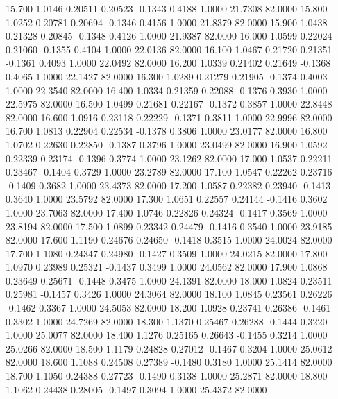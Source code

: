   15.700   1.0146   0.20511   0.20523  -0.1343   0.4188   1.0000  21.7308  82.0000
  15.800   1.0252   0.20781   0.20694  -0.1346   0.4156   1.0000  21.8379  82.0000
  15.900   1.0438   0.21328   0.20845  -0.1348   0.4126   1.0000  21.9387  82.0000
  16.000   1.0599   0.22024   0.21060  -0.1355   0.4104   1.0000  22.0136  82.0000
  16.100   1.0467   0.21720   0.21351  -0.1361   0.4093   1.0000  22.0492  82.0000
  16.200   1.0339   0.21402   0.21649  -0.1368   0.4065   1.0000  22.1427  82.0000
  16.300   1.0289   0.21279   0.21905  -0.1374   0.4003   1.0000  22.3540  82.0000
  16.400   1.0334   0.21359   0.22088  -0.1376   0.3930   1.0000  22.5975  82.0000
  16.500   1.0499   0.21681   0.22167  -0.1372   0.3857   1.0000  22.8448  82.0000
  16.600   1.0916   0.23118   0.22229  -0.1371   0.3811   1.0000  22.9996  82.0000
  16.700   1.0813   0.22904   0.22534  -0.1378   0.3806   1.0000  23.0177  82.0000
  16.800   1.0702   0.22630   0.22850  -0.1387   0.3796   1.0000  23.0499  82.0000
  16.900   1.0592   0.22339   0.23174  -0.1396   0.3774   1.0000  23.1262  82.0000
  17.000   1.0537   0.22211   0.23467  -0.1404   0.3729   1.0000  23.2789  82.0000
  17.100   1.0547   0.22262   0.23716  -0.1409   0.3682   1.0000  23.4373  82.0000
  17.200   1.0587   0.22382   0.23940  -0.1413   0.3640   1.0000  23.5792  82.0000
  17.300   1.0651   0.22557   0.24144  -0.1416   0.3602   1.0000  23.7063  82.0000
  17.400   1.0746   0.22826   0.24324  -0.1417   0.3569   1.0000  23.8194  82.0000
  17.500   1.0899   0.23342   0.24479  -0.1416   0.3540   1.0000  23.9185  82.0000
  17.600   1.1190   0.24676   0.24650  -0.1418   0.3515   1.0000  24.0024  82.0000
  17.700   1.1080   0.24347   0.24980  -0.1427   0.3509   1.0000  24.0215  82.0000
  17.800   1.0970   0.23989   0.25321  -0.1437   0.3499   1.0000  24.0562  82.0000
  17.900   1.0868   0.23649   0.25671  -0.1448   0.3475   1.0000  24.1391  82.0000
  18.000   1.0824   0.23511   0.25981  -0.1457   0.3426   1.0000  24.3064  82.0000
  18.100   1.0845   0.23561   0.26226  -0.1462   0.3367   1.0000  24.5053  82.0000
  18.200   1.0928   0.23741   0.26386  -0.1461   0.3302   1.0000  24.7269  82.0000
  18.300   1.1370   0.25467   0.26288  -0.1444   0.3220   1.0000  25.0077  82.0000
  18.400   1.1276   0.25165   0.26643  -0.1455   0.3214   1.0000  25.0266  82.0000
  18.500   1.1179   0.24828   0.27012  -0.1467   0.3204   1.0000  25.0612  82.0000
  18.600   1.1088   0.24508   0.27389  -0.1480   0.3180   1.0000  25.1414  82.0000
  18.700   1.1050   0.24388   0.27723  -0.1490   0.3138   1.0000  25.2871  82.0000
  18.800   1.1062   0.24438   0.28005  -0.1497   0.3094   1.0000  25.4372  82.0000
